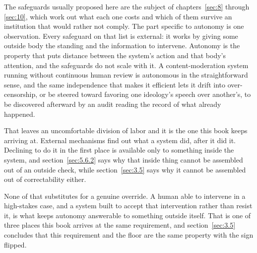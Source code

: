 The safeguards usually proposed here are the subject of chapters~\ref{sec:8} through \ref{sec:10}, which work out what each one costs and which of them survive an institution that would rather not comply. The part specific to autonomy is one observation. Every safeguard on that list is external: it works by giving some outside body the standing and the information to intervene. Autonomy is the property that puts distance between the system's action and that body's attention, and the safeguards do not scale with it. A content-moderation system running without continuous human review is autonomous in the straightforward sense, and the same independence that makes it efficient lets it drift into over-censorship, or be steered toward favoring one ideology's speech over another's, to be discovered afterward by an audit reading the record of what already happened.

That leaves an uncomfortable division of labor and it is the one this book keeps arriving at. External mechanisms find out what a system did, after it did it. Declining to do it in the first place is available only to something inside the system, and section~\ref{sec:5.6.2} says why that inside thing cannot be assembled out of an outside check, while section~\ref{sec:3.5} says why it cannot be assembled out of correctability either.

None of that substitutes for a genuine override. A human able to intervene in a high-stakes case, and a system built to accept that intervention rather than resist it, is what keeps autonomy answerable to something outside itself. That is one of three places this book arrives at the same requirement, and section~\ref{sec:3.5} concludes that this requirement and the floor are the same property with the sign flipped.
